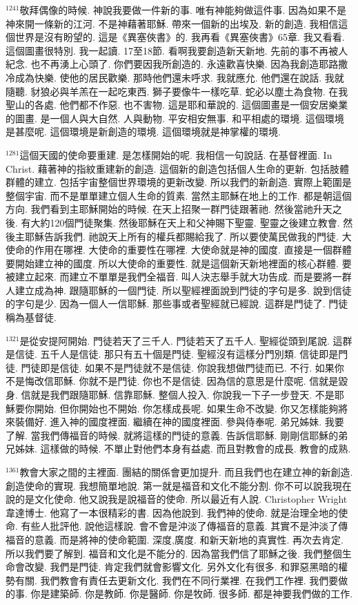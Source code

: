 \documentclass{book}
\begin{document}
$^{1241}$敬拜偶像的時候.
神說我要做一件新的事.
唯有神能夠做這件事.
因為如果不是神來開一條新的江河.
不是神藉著耶穌.
帶來一個新的出埃及.
新的創造.
我相信這個世界是沒有盼望的.
這是《異塞俠書》的.
我再看《異塞俠書》65章.
我又看看.
這個圖畫很特別.
我一起讀.
17至18節.
看啊我要創造新天新地.
先前的事不再被人紀念.
也不再湧上心頭了.
你們要因我所創造的.
永遠歡喜快樂.
因為我創造耶路撒冷成為快樂.
使他的居民歡樂.
那時他們還未呼求.
我就應允.
他們還在說話.
我就隨聽.
豺狼必與羊羔在一起吃東西.
獅子要像牛一樣吃草.
蛇必以塵土為食物.
在我聖山的各處.
他們都不作惡.
也不害物.
這是耶和華說的.
這個圖畫是一個安居樂業的圖畫.
是一個人與大自然.
人與動物.
平安相安無事.
和平相處的環境.
這個環境是甚麼呢.
這個環境是新創造的環境.
這個環境就是神掌權的環境.

$^{1281}$這個天國的使命要重建.
是怎樣開始的呢.
我相信一句說話.
在基督裡面.
In Christ.
藉著神的指紋重建新的創造.
這個新的創造包括個人生命的更新.
包括肢體群體的建立.
包括宇宙整個世界環境的更新改變.
所以我們的新創造.
實際上範圍是整個宇宙.
而不是單單建立個人生命的質素.
當然主耶穌在地上的工作.
都是朝這個方向.
我們看到主耶穌開始的時候.
在天上招聚一群門徒跟著祂.
然後當祂升天之後.
有大約120個門徒聚集.
然後耶穌在天上和父神賜下聖靈.
聖靈之後建立教會.
然後主耶穌告訴我們.
祂說天上所有的權兵都賜給我了.
所以要使萬民做我的門徒.
大使命的作用在哪裡.
大使命的重要性在哪裡.
大使命就是神的國度.
直接是一個群體要開始建立神的國度.
所以大使命的重要性.
就是這個新天新地裡面的核心群體.
要被建立起來.
而建立不單單是我們全福音.
叫人決志舉手就大功告成.
而是要將一群人建立成為神.
跟隨耶穌的一個門徒.
所以聖經裡面說到門徒的字句是多.
說到信徒的字句是少.
因為一個人一信耶穌.
那些事或者聖經就已經說.
這群是門徒了.
門徒稱為基督徒.

$^{1321}$是從安提阿開始.
門徒若天了三千人.
門徒若天了五千人.
聖經從頭到尾說.
這群是信徒.
五千人是信徒.
那只有五十個是門徒.
聖經沒有這樣分門別類.
信徒即是門徒.
門徒即是信徒.
如果不是門徒就不是信徒.
你說我想做門徒而已.
不行.
如果你不是悔改信耶穌.
你就不是門徒.
你也不是信徒.
因為信的意思是什麼呢.
信就是毀身.
信就是我們跟隨耶穌.
信靠耶穌.
整個人投入.
你說我一下子一步登天.
不是耶穌要你開始.
但你開始也不開始.
你怎樣成長呢.
如果生命不改變.
你又怎樣能夠將來裝備好.
進入神的國度裡面.
繼續在神的國度裡面.
參與侍奉呢.
弟兄姊妹.
我要了解.
當我們傳福音的時候.
就將這樣的門徒的意義.
告訴信耶穌.
剛剛信耶穌的弟兄姊妹.
這樣做的時候.
不單止對他們本身有益處.
而且對教會的成長.
教會的成熟.

$^{1361}$教會大家之間的主裡面.
團結的關係會更加提升.
而且我們也在建立神的新創造.
創造使命的實現.
我想簡單地說.
第一就是福音和文化不能分割.
你不可以說我現在說的是文化使命.
他又說我是說福音的使命.
所以最近有人說.
Christopher Wright 韋達博士.
他寫了一本很精彩的書.
因為他說到.
我們神的使命.
就是治理全地的使命.
有些人批評他.
說他這樣說.
會不會是沖淡了傳福音的意義.
其實不是沖淡了傳福音的意義.
而是將神的使命範圍.
深度,廣度.
和新天新地的真實性.
再次去肯定.
所以我們要了解到.
福音和文化是不能分的.
因為當我們信了耶穌之後.
我們整個生命會改變.
我們是門徒.
肯定我們就會影響文化.
另外文化有很多.
和罪惡黑暗的權勢有關.
我們教會有責任去更新文化.
我們在不同行業裡.
在我們工作裡.
我們要做的事.
你是建築師.
你是教師.
你是醫師.
你是牧師.
很多師.
都是神要我們做的工作.
\end{document}
